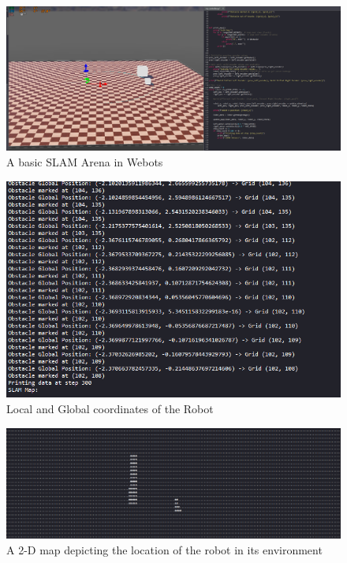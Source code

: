 \begin{figure}[H]
    \centering
    \includegraphics[width=1.0\linewidth]{assets/images/localisation/slam_arena.png}
    \caption{A basic SLAM Arena in Webots}
    \label{fig: slam_arena image} 
\end{figure}

\begin{figure}[H]
    \centering
    \includegraphics[width=1.0\linewidth]{assets/images/localisation/coordinates.png}
    \caption{Local and Global coordinates of the Robot}
    \label{fig: coordinates} 
\end{figure}

\begin{figure}[H]
    \centering
    \includegraphics[width=1.0\linewidth]{assets/images/localisation/map.png}
    \caption{A 2-D map depicting the location of the robot in its environment}
    \label{fig: map} 
\end{figure}



